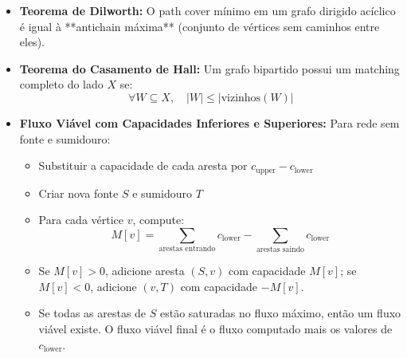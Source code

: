 \begin{small}
\begin{itemize}
\begin{itemize}
        \item \textbf{Teorema de Dilworth:} O path cover mínimo em um grafo dirigido acíclico é igual à **antichain máxima** (conjunto de vértices sem caminhos entre eles).

        \item \textbf{Teorema do Casamento de Hall:} Um grafo bipartido possui um matching completo do lado $X$ se:
        \[
        \forall W \subseteq X, \quad |W| \leq |\text{vizinhos}(W)|
        \]

        \item \textbf{Fluxo Viável com Capacidades Inferiores e Superiores:} Para rede sem fonte e sumidouro:
        \begin{itemize}
            \item Substituir a capacidade de cada aresta por $c_{\text{upper}} - c_{\text{lower}}$
            \item Criar nova fonte $S$ e sumidouro $T$
            \item Para cada vértice $v$, compute:
            \[
            M[v] = \sum_{\text{arestas entrando}} c_{\text{lower}} - \sum_{\text{arestas saindo}} c_{\text{lower}}
            \]
            \item Se $M[v] > 0$, adicione aresta $(S, v)$ com capacidade $M[v]$; se $M[v] < 0$, adicione $(v, T)$ com capacidade $-M[v]$.
            \item Se todas as arestas de $S$ estão saturadas no fluxo máximo, então um fluxo viável existe. O fluxo viável final é o fluxo computado mais os valores de $c_{\text{lower}}$.
        \end{itemize}
    \end{itemize}
\end{itemize}
\end{small}

